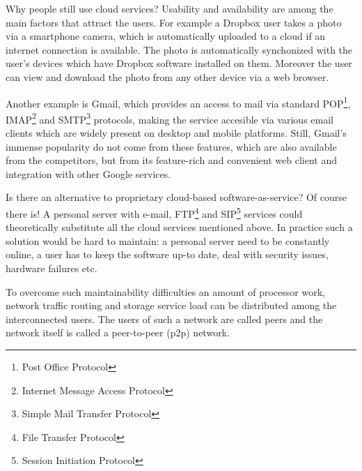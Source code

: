 Why people still use cloud services? Usability and availability are
among the main factors that attract the users. For example a Dropbox
user takes a photo via a smartphone camera, which is automatically
uploaded to a cloud if an internet connection is available.
The photo is automatically synchonized with the user's devices which
have Dropbox software installed on them. Moreover the user can
view and download the photo from any other device via a web browser.

Another example is Gmail, which provides an access to mail via
standard
POP\footnote{Post Office Protocol},
IMAP\footnote{Internet Message Access Protocol}
and SMTP\footnote{Simple Mail Transfer Protocol}
protocols, making the service accesible
via various email clients which are widely present on desktop
and mobile platforms. Still, Gmail's immense
popularity\cite{gmail-popularity}
do not come from these features, which are also available
from the competitors, but from its feature-rich and convenient
web client and integration with other Google services.

Is there an alternative to proprietary cloud-based
software-as-service?
Of course there is! A personal server with e-mail,
FTP\footnote{File Transfer Protocol} and
SIP\footnote{Session Initiation Protocol}
services could theoretically substitute all the cloud services
mentioned above. In practice such a solution would be hard to maintain:
a personal server need to be constantly online, a user has to keep
the software up-to date, deal with security issues, hardware failures
etc.

To overcome such maintainability difficulties an amount of
processor work, network traffic routing and storage service load
can be distributed among the interconnected users.
The users of such a network are called peers and the network
itself is called a peer-to-peer (p2p) network.

